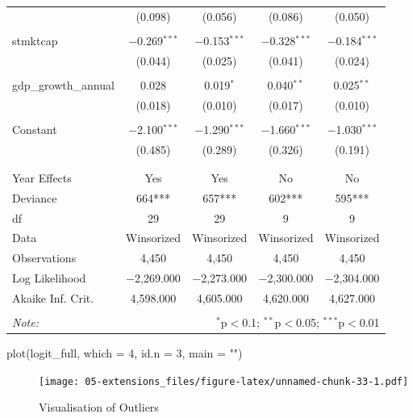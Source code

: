 \documentclass[a4paper,nobind]{templates/ociamthesis}
\newenvironment{Shaded}{\begin{snugshade}}{\end{snugshade}}
\newcommand{\AttributeTok}[1]{\textcolor[rgb]{0.77,0.63,0.00}{#1}}
\newcommand{\DecValTok}[1]{\textcolor[rgb]{0.00,0.00,0.81}{#1}}
\newcommand{\FunctionTok}[1]{\textcolor[rgb]{0.00,0.00,0.00}{#1}}
\newcommand{\NormalTok}[1]{#1}
\newcommand{\StringTok}[1]{\textcolor[rgb]{0.31,0.60,0.02}{#1}}
\renewenvironment{Shaded}
{
  \vspace{10pt}%
  \begin{snugshade}%
}{%
  \end{snugshade}%
  \vspace{8pt}%
}
\begin{document}
\begin{table}[!htbp]
\begin{tabular}{@{\extracolsep{5pt}}lcccc}
  & (0.098) & (0.056) & (0.086) & (0.050) \\ 
  & & & & \\ 
 stmktcap & $-$0.269$^{***}$ & $-$0.153$^{***}$ & $-$0.328$^{***}$ & $-$0.184$^{***}$ \\ 
  & (0.044) & (0.025) & (0.041) & (0.024) \\ 
  & & & & \\ 
 gdp\_growth\_annual & 0.028 & 0.019$^{*}$ & 0.040$^{**}$ & 0.025$^{**}$ \\ 
  & (0.018) & (0.010) & (0.017) & (0.010) \\ 
  & & & & \\ 
 Constant & $-$2.100$^{***}$ & $-$1.290$^{***}$ & $-$1.660$^{***}$ & $-$1.030$^{***}$ \\ 
  & (0.485) & (0.289) & (0.326) & (0.191) \\ 
  & & & & \\ 
\hline \\[-1.8ex] 
Year Effects & Yes & Yes & No & No \\ 
Deviance & 664*** & 657*** & 602*** & 595*** \\ 
df & 29 & 29 & 9 & 9 \\ 
Data & Winsorized & Winsorized & Winsorized & Winsorized \\ 
Observations & 4,450 & 4,450 & 4,450 & 4,450 \\ 
Log Likelihood & $-$2,269.000 & $-$2,273.000 & $-$2,300.000 & $-$2,304.000 \\ 
Akaike Inf. Crit. & 4,598.000 & 4,605.000 & 4,620.000 & 4,627.000 \\ 
\hline 
\hline \\[-1.8ex] 
\textit{Note:}  & \multicolumn{4}{r}{$^{*}$p$<$0.1; $^{**}$p$<$0.05; $^{***}$p$<$0.01} \\ 
\end{tabular} 
\end{table}

\blandscape

\begin{Shaded}
\begin{Highlighting}[]
\FunctionTok{plot}\NormalTok{(logit\_full, }\AttributeTok{which =} \DecValTok{4}\NormalTok{, }\AttributeTok{id.n =} \DecValTok{3}\NormalTok{, }\AttributeTok{main =} \StringTok{""}\NormalTok{)}
\end{Highlighting}
\end{Shaded}

\begin{figure}
\centering
\texttt{[image: 05-extensions\_files/figure-latex/unnamed-chunk-33-1.pdf]}
\caption{\label{fig:unnamed-chunk-33}Visualisation of Outliers}
\end{figure}
\end{document}
